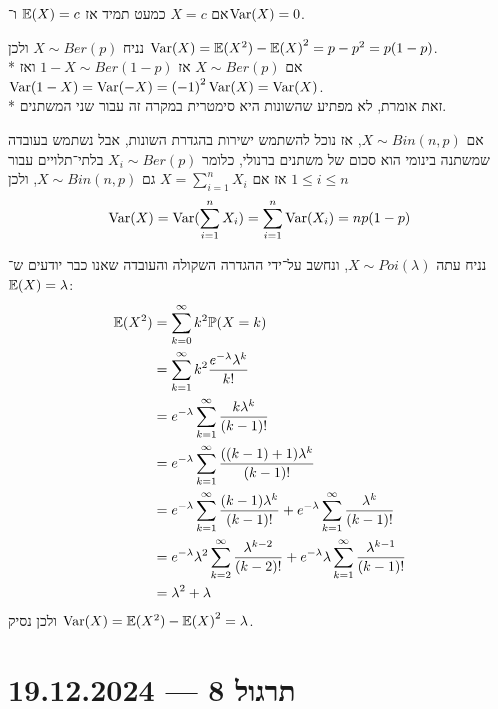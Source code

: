 \begin{example}
	אם $X = c$ כמעט תמיד אז $\mathbb{E}(X) = c$ ו־$\operatorname{Var}(X) = 0$.
\end{example}
\begin{example}
	נניח $X \sim Ber(p)$ ולכן $\operatorname{Var}(X) = \mathbb{E}(X^2) - {\mathbb{E}(X)}^2 = p - p^2 = p(1 - p)$. \\*
	אם $X \sim Ber(p)$ אז $1 - X \sim Ber(1 - p)$ ואז $\operatorname{Var}(1 - X) = \operatorname{Var}(-X) = {(-1)}^2 \operatorname{Var}(X) = \operatorname{Var}(X)$. \\*
	זאת אומרת, לא מפתיע שהשונות היא סימטרית במקרה זה עבור שני המשתנים.
\end{example}
\begin{example}
	אם $X \sim Bin(n, p)$, אז נוכל להשתמש ישירות בהגדרת השונות, אבל נשתמש בעובדה שמשתנה בינומי הוא סכום של משתנים ברנולי,
	כלומר $X_i \sim Ber(p)$ בלתי־תלויים עבור $1 \le i \le n$ אז אם $X = \sum_{i = 1}^{n} X_i$ גם $X \sim Bin(n, p)$, ולכן
	\[
		\operatorname{Var}(X)
		= \operatorname{Var}(\sum_{i = 1}^{n} X_i)
		= \sum_{i = 1}^{n} \operatorname{Var}(X_i)
		= n p(1 - p)
	\]
\end{example}
\begin{example}
	נניח עתה $X \sim Poi(\lambda)$, ונחשב על־ידי ההגדרה השקולה והעובדה שאנו כבר יודעים ש־$\mathbb{E}(X) = \lambda$:
	\begin{align*}
		\mathbb{E}(X^2)
		& = \sum_{k = 0}^{\infty} k^2 \mathbb{P}(X = k) \\
		& = \sum_{k = 1}^{\infty} k^2 \frac{e^{-\lambda} \lambda^k}{k!} \\
		& = e^{-\lambda} \sum_{k = 1}^{\infty} \frac{k \lambda^k}{(k - 1)!} \\
		& = e^{-\lambda} \sum_{k = 1}^{\infty} \frac{((k - 1) + 1) \lambda^k}{(k - 1)!} \\
		& = e^{-\lambda} \sum_{k = 1}^{\infty} \frac{(k - 1) \lambda^k}{(k - 1)!} + e^{-\lambda} \sum_{k = 1}^{\infty} \frac{\lambda^k}{(k - 1)!} \\
		& = e^{-\lambda} \lambda^2 \sum_{k = 2}^{\infty} \frac{\lambda^{k - 2}}{(k - 2)!} + e^{-\lambda} \lambda \sum_{k = 1}^{\infty} \frac{\lambda^{k - 1}}{(k - 1)!} \\
		& = \lambda^2 + \lambda
	\end{align*}
	ולכן נסיק $\operatorname{Var}(X) = \mathbb{E}(X^2) - {\mathbb{E}(X)}^2 = \lambda$.
\end{example}

\section{תרגול 8 --- 19.12.2024}
